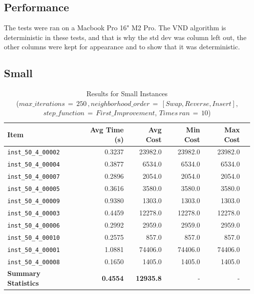 \documentclass{article}
\begin{document}
\subsection*{Performance}
The tests were ran on a Macbook Pro 16" M2 Pro. The VND algorithm is deterministic in these tests, and that is why the std dev was column left out, the other columns were kept for appearance and to show that it was deterministic.

\subsection*{Small}

\begin{table}[H]
	\centering
 \caption{Results for Small Instances \\($max\_iterations \,{=}\, 250\,, neighborhood\_order \,{=}\, [Swap, Reverse, Insert]$, $step\_function \,{=}\, First\_Improvement$, $Times\, ran \,{=}\, 10$)}
    \hspace*{-1cm}
	\begin{tabular}{lrrrrr}
		\toprule
		\textbf{Item} & \textbf{Avg Time (s)} & \textbf{Avg Cost} & \textbf{Min Cost} & \textbf{Max Cost}  \\
		\midrule
		\texttt{inst\_50\_4\_00002} & 0.3237 & 23982.0 & 23982.0 & 23982.0 \\ 
		\texttt{inst\_50\_4\_00004} & 0.3877 & 6534.0  & 6534.0  & 6534.0  \\ 
		\texttt{inst\_50\_4\_00007} & 0.2896 & 2054.0  & 2054.0  & 2054.0  \\ 
		\texttt{inst\_50\_4\_00005} & 0.3616 & 3580.0  & 3580.0  & 3580.0  \\ 
		\texttt{inst\_50\_4\_00009} & 0.9380 & 1303.0  & 1303.0  & 1303.0  \\ 
		\texttt{inst\_50\_4\_00003} & 0.4459 & 12278.0 & 12278.0 & 12278.0 \\ 
		\texttt{inst\_50\_4\_00006} & 0.2992 & 2959.0  & 2959.0  & 2959.0  \\ 
		\texttt{inst\_50\_4\_00010} & 0.2575 & 857.0   & 857.0   & 857.0   \\ 
		\texttt{inst\_50\_4\_00001} & 1.0881 & 74406.0 & 74406.0 & 74406.0 \\ 
		\texttt{inst\_50\_4\_00008} & 0.1650 & 1405.0  & 1405.0  & 1405.0  \\ 
		\midrule
		\textbf{Summary Statistics} & \textbf{0.4554} & \textbf{12935.8} & - & - \\
		\bottomrule
	\end{tabular}
	\label{tab:performance_metrics_small_vnd}
\end{table}
\end{document}
